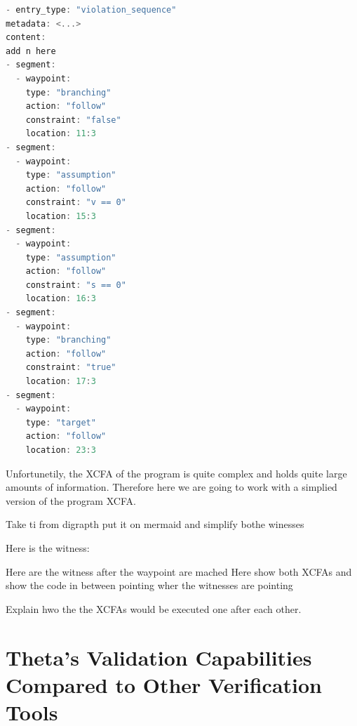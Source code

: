 \begin{lstlisting}[style=yaml, language=C,caption=Violation Witness]
- entry_type: "violation_sequence"
metadata: <...>
content:
add n here
- segment: 
  - waypoint:
    type: "branching"
    action: "follow"
    constraint: "false"
    location: 11:3
- segment: 
  - waypoint:
    type: "assumption"
    action: "follow"
    constraint: "v == 0"
    location: 15:3
- segment:
  - waypoint:
    type: "assumption"
    action: "follow"
    constraint: "s == 0"
    location: 16:3
- segment:
  - waypoint:
    type: "branching"
    action: "follow"
    constraint: "true"
    location: 17:3
- segment:
  - waypoint:
    type: "target"
    action: "follow"
    location: 23:3
\end{lstlisting}

Unfortunetily, the XCFA of the program is quite complex and holds quite large amounts of information.
Therefore here we are going to work with a simplied version of the program XCFA.

Take ti from digrapth put it on mermaid and simplify bothe winesses

Here is the witness:

Here are the witness after the waypoint are mached
Here show both XCFAs and show the code in between pointing wher the witnesses are pointing

Explain hwo the the XCFAs would be executed one after each other.

\section{Theta's Validation Capabilities Compared to Other Verification Tools}
